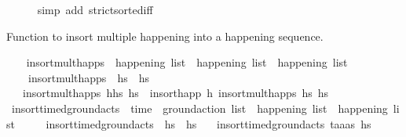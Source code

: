 \begin{isabellebody}
\ \ \ \ \isamarkupfalse%
\ {\isacharparenleft}{\kern0pt}simp\ add{\isacharcolon}{\kern0pt}\ strict{\isacharunderscore}{\kern0pt}sorted{\isacharunderscore}{\kern0pt}iff{\isacharparenright}{\kern0pt}%
\endisatagproof
{\isafoldproof}%
%
\isadelimproof
%
\endisadelimproof
%
\begin{isamarkuptext}%
Function to insort multiple happening into a happening sequence.%
\end{isamarkuptext}\isamarkuptrue%
\ \ \isamarkupfalse%
\ insort{\isacharunderscore}{\kern0pt}mult{\isacharunderscore}{\kern0pt}happs\ {\isacharcolon}{\kern0pt}{\isacharcolon}{\kern0pt}\ {\isachardoublequoteopen}happening\ list\ {\isasymRightarrow}\ happening\ list\ {\isasymRightarrow}\ happening\ list{\isachardoublequoteclose}\ \isanewline
\ \ \ \ {\isachardoublequoteopen}insort{\isacharunderscore}{\kern0pt}mult{\isacharunderscore}{\kern0pt}happs\ {\isacharbrackleft}{\kern0pt}{\isacharbrackright}{\kern0pt}\ hs\ {\isacharequal}{\kern0pt}\ hs\isanewline
\ \ {\isacharbar}{\kern0pt}\ {\isachardoublequoteopen}insort{\isacharunderscore}{\kern0pt}mult{\isacharunderscore}{\kern0pt}happs\ {\isacharparenleft}{\kern0pt}h{\isacharhash}{\kern0pt}hs\ hs\ {\isacharequal}{\kern0pt}\ insort{\isacharunderscore}{\kern0pt}happ\ h\ {\isacharparenleft}{\kern0pt}insort{\isacharunderscore}{\kern0pt}mult{\isacharunderscore}{\kern0pt}happs\ hs\ hs\isanewline
\isanewline
\ \ \isamarkupfalse%
\ insort{\isacharunderscore}{\kern0pt}timed{\isacharunderscore}{\kern0pt}ground{\isacharunderscore}{\kern0pt}acts\ {\isacharcolon}{\kern0pt}{\isacharcolon}{\kern0pt}\ {\isachardoublequoteopen}{\isacharparenleft}{\kern0pt}time\ {\isasymtimes}\ ground{\isacharunderscore}{\kern0pt}action{\isacharparenright}{\kern0pt}\ list\ {\isasymRightarrow}\ happening\ list\ {\isasymRightarrow}\ happening\ list{\isachardoublequoteclose}\ \isanewline
\ \ \ \ {\isachardoublequoteopen}insort{\isacharunderscore}{\kern0pt}timed{\isacharunderscore}{\kern0pt}ground{\isacharunderscore}{\kern0pt}acts\ {\isacharbrackleft}{\kern0pt}{\isacharbrackright}{\kern0pt}\ hs\ {\isacharequal}{\kern0pt}\ hs{\isachardoublequoteclose}\isanewline
\ \ {\isacharbar}{\kern0pt}\ {\isachardoublequoteopen}insort{\isacharunderscore}{\kern0pt}timed{\isacharunderscore}{\kern0pt}ground{\isacharunderscore}{\kern0pt}acts\ {\isacharparenleft}{\kern0pt}{\isacharparenleft}{\kern0pt}t\isactrlsub a{\isacharcomma}{\kern0pt}a{\isacharparenright}{\kern0pt}{\isacharhash}{\kern0pt}as{\isacharparenright}{\kern0pt}\ hs\ {\isacharequal}{\kern0pt}\ \isanewline

\end{isabellebody}
